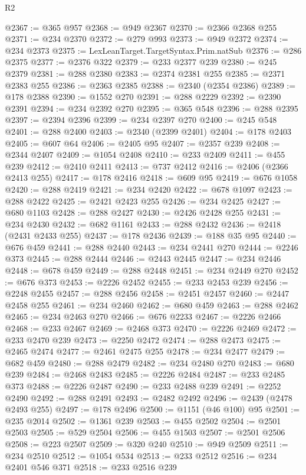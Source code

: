 \begin{lexlean}{R2}
\begin{coremodule}
@2367 := @365 @957
@2368 := @949 @2367
@2370 := @2366 @2368 @255
@2371 := @234 @2370
@2372 := @279 @993
@2373 := @949 @2372
@2374 := @234 @2373
@2375 := LexLeanTarget.TargetSyntax.Prim.natSub
@2376 := @286 @2375
@2377 := @2376 @322
@2379 := @233 @2377 @239
@2380 := @245 @2379
@2381 := @288 @2380
@2383 := @2374 @2381 @255
@2385 := @2371 @2383 @255
@2386 := @2363 @2385
@2388 := @2340 (@2354 @2386)
@2389 := @178 @2388
@2390 := @1552 @270
@2391 := @288 @2229
@2392 := @2390 @2391
@2394 := @234 @2392 @270
@2395 := @365 @548
@2396 := @288 @2395
@2397 := @2394 @2396
@2399 := @234 @2397 @270
@2400 := @245 @548
@2401 := @288 @2400
@2403 := @2340 (@2399 @2401)
@2404 := @178 @2403
@2405 := @607 @64
@2406 := @2405 @95
@2407 := @2357 @239
@2408 := @2344 @2407
@2409 := @1054 @2408
@2410 := @233 @2409
@2411 := @455 @239
@2412 := @2410 @2411
@2413 := @737 @2412
@2416 := @2406 (@2366 @2413 @255)
@2417 := @178 @2416
@2418 := @609 @95
@2419 := @676 @1058
@2420 := @288 @2419
@2421 := @234 @2420
@2422 := @678 @1097
@2423 := @288 @2422
@2425 := @2421 @2423 @255
@2426 := @234 @2425
@2427 := @680 @1103
@2428 := @288 @2427
@2430 := @2426 @2428 @255
@2431 := @234 @2430
@2432 := @682 @1161
@2433 := @288 @2432
@2436 := @2418 (@2431 @2433 @255)
@2437 := @178 @2436
@2439 := @188 @35 @95
@2440 := @676 @459
@2441 := @288 @2440
@2443 := @234 @2441 @270
@2444 := @2246 @373
@2445 := @288 @2444
@2446 := @2443 @2445
@2447 := @234 @2446
@2448 := @678 @459
@2449 := @288 @2448
@2451 := @234 @2449 @270
@2452 := @676 @373
@2453 := @2226 @2452
@2455 := @233 @2453 @239
@2456 := @2248 @2455
@2457 := @288 @2456
@2458 := @2451 @2457
@2460 := @2447 @2458 @255
@2461 := @234 @2460
@2462 := @680 @459
@2463 := @288 @2462
@2465 := @234 @2463 @270
@2466 := @676 @2233
@2467 := @2226 @2466
@2468 := @233 @2467
@2469 := @2468 @373
@2470 := @2226 @2469
@2472 := @233 @2470 @239
@2473 := @2250 @2472
@2474 := @288 @2473
@2475 := @2465 @2474
@2477 := @2461 @2475 @255
@2478 := @234 @2477
@2479 := @682 @459
@2480 := @288 @2479
@2482 := @234 @2480 @270
@2483 := @680 @239
@2484 := @2468 @2483
@2485 := @2226 @2484
@2487 := @233 @2485 @373
@2488 := @2226 @2487
@2490 := @233 @2488 @239
@2491 := @2252 @2490
@2492 := @288 @2491
@2493 := @2482 @2492
@2496 := @2439 (@2478 @2493 @255)
@2497 := @178 @2496
@2500 := @1151 (@46 @100) @95
@2501 := @235 @2014
@2502 := @1361 @239
@2503 := @455 @2502
@2504 := @2501 @2503
@2505 := @529 @2504
@2506 := @455 @1503
@2507 := @2501 @2506
@2508 := @223 @2507
@2509 := @320 @240
@2510 := @949 @2509
@2511 := @234 @2510
@2512 := @1054 @534
@2513 := @233 @2512
@2516 := @234 @2401 @546 @371
@2518 := @233 @2516 @239

\end{coremodule}
\end{lexlean}

